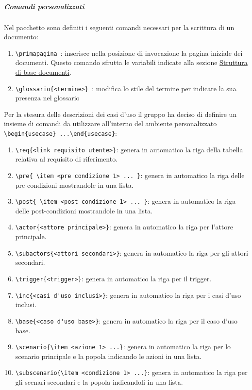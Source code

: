 \subparagraph{Comandi personalizzati}
\label{subpar:comandi_personalizzati}
Nel pacchetto sono definiti i seguenti comandi necessari per la scrittura di un documento:
\begin{enumerate}
    \item \lstinline|\primapagina|\ : inserisce nella posizione di invocazione la pagina iniziale dei documenti.
    Questo comando sfrutta le variabili indicate alla sezione \hyperref[par:struttura_di_base_documenti]{Struttura di base documenti}.
    \item \lstinline|\glossario{<termine>}|\ : modifica lo stile del termine per indicare la sua presenza nel glossario    
\end{enumerate}
Per la stesura delle descrizioni dei casi d'uso il gruppo ha deciso di definire un insieme di comandi da utilizzare all'interno del ambiente personalizzato \lstinline|\begin{usecase} ...\end{usecase}|:
\label{subpar:casi_uso}
\begin{enumerate}
    \item \lstinline|\req{<link requisito utente>}|: genera in automatico la riga della tabella relativa al requisito di riferimento.
    \item \lstinline|\pre{ \item <pre condizione 1> ... }|: genera in automatico la riga delle pre-condizioni mostrandole in una lista.
    \item \lstinline|\post{ \item <post condizione 1> ... }|: genera in automatico la riga delle post-condizioni mostrandole in una lista.
    \item \lstinline|\actor{<attore principale>}|: genera in automatico la riga per l'attore principale.
    \item \lstinline|\subactors{<attori secondari>}|: genera in automatico la riga per gli attori secondari.
    \item \lstinline|\trigger{<trigger>}|: genera in automatico la riga per il trigger.
    \item \lstinline|\inc{<casi d'uso inclusi>}|: genera in automatico la riga per i casi d'uso inclusi.
    \item \lstinline|\base{<caso d'uso base>}|: genera in automatico la riga per il caso d'uso base.
    \item \lstinline|\scenario{\item <azione 1> ...}|: genera in automatico la riga per lo scenario principale e la popola indicando le azioni in una lista.
    \item \lstinline|\subscenario{\item <condizione 1> ...}|: genera in automatico la riga per gli scenari secondari e la popola indicandoli in una lista.
\end{enumerate}

